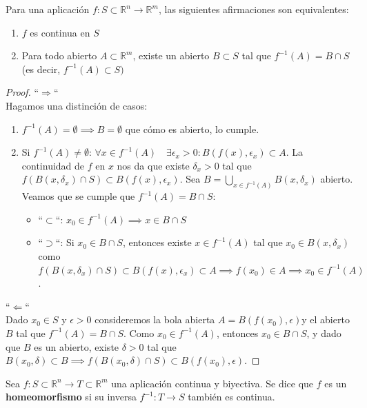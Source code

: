 \begin{teorema}
    Para una aplicación $f : S \subset \mathbb{R}^n \to \mathbb{R}^m$, las siguientes afirmaciones son equivalentes:
    \begin{enumerate}
        \item $f$ es continua en $S$
        \item Para todo abierto $A \subset \mathbb{R}^m$, existe un abierto $B \subset S$ tal que $f^{-1}(A) = B \cap S$ (es decir, $f^{-1}(A) \subset S)$
    \end{enumerate}
\end{teorema}
\begin{proof}
    ``$\Rightarrow$`` \\
    Hagamos una distinción de casos:
    \begin{enumerate}
        \item $f^{-1}(A) = \emptyset \implies B = \emptyset$ que cómo es abierto, lo cumple.\item Si $f^{-1}(A) \neq \emptyset$: $\forall x \in f^{-1}(A) \quad \exists \epsilon_x > 0 : B(f(x), \epsilon_x) \subset A$. La continuidad de $f$ en $x$ nos da que existe $\delta_x > 0$ tal que $f(B(x, \delta_x) \cap S) \subset B(f(x), \epsilon_x)$. Sea $B = \bigcup_{x \in f^{-1}(A)} B(x, \delta_x)$ abierto. \\
        Veamos que se cumple que $f^{-1}(A) = B \cap S$: 
        \begin{itemize}
            \item ``$\subset$``: $x_0 \in f^{-1}(A) \implies x \in B \cap S$
            \item ``$\supset$``: Si $x_0 \in B \cap S$, entonces existe $x \in f^{-1}(A)$ tal que $x_0 \in B(x, \delta_x)$ como $f(B(x, \delta_x) \cap S) \subset B(f(x), \epsilon_x) \subset A \implies f(x_0) \in A \implies x_0 \in f^{-1}(A)$.
        \end{itemize}
    \end{enumerate}
    ``$\Leftarrow$`` \\
    Dado $x_0 \in S$ y $\epsilon > 0$ consideremos la bola abierta $A = B(f(x_0), \epsilon)$y el abierto $B$ tal que $f^{-1}(A) = B \cap S$. Como $x_0 \in f^{-1}(A)$, entonces $x_0 \in B \cap S$, y dado que $B$ es un abierto, existe $\delta > 0$ tal que $B(x_0, \delta) \subset B \implies f(B(x_0, \delta) \cap S) \subset B(f(x_0), \epsilon)$. 
\end{proof}

\begin{definición}[Homeomorfismo]
    Sea $f: S \subset \mathbb{R}^n \to T \subset \mathbb{R}^m$ una aplicación continua y biyectiva. Se dice que $f$ es un \textbf{homeomorfismo} si su inversa $f^{-1} : T \to S$ también es continua.
\end{definición}

